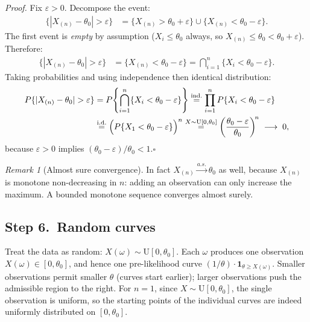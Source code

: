 \documentclass[a4paper,oneside,12pt]{extarticle}
\theoremstyle{plain}
\theoremstyle{definition}
\theoremstyle{remark}
\newtheorem{remark}[proposition]{Remark}
\begin{document}
\smallskip
\noindent\emph{Proof.} Fix $\varepsilon > 0$.  Decompose the event:
\begin{align*}
  \{|X_{(n)} - \theta_0| > \varepsilon\}
  &= \{X_{(n)} > \theta_0 + \varepsilon\} \cup \{X_{(n)} < \theta_0 - \varepsilon\}.
\end{align*}
The first event is \emph{empty} by assumption ($X_i \le \theta_0$
always, so $X_{(n)} \le \theta_0 < \theta_0 + \varepsilon$).
Therefore:
\begin{align*}
  \{|X_{(n)} - \theta_0| > \varepsilon\}
  &= \{X_{(n)} < \theta_0 - \varepsilon\}
   = \bigcap_{i=1}^n \{X_i < \theta_0 - \varepsilon\}.
\end{align*}
Taking probabilities and using independence then identical distribution:
\begin{align*}
  P\{|X_{(n)} - \theta_0| > \varepsilon\}
  &= P\!\left\{\bigcap_{i=1}^n \{X_i < \theta_0-\varepsilon\}\right\}
   \stackrel{\mathrm{ind.}}{=}
   \prod_{i=1}^n P\{X_i < \theta_0 - \varepsilon\} \\
  &\stackrel{\mathrm{i.d.}}{=}
   \Bigl(P\{X_1 < \theta_0-\varepsilon\}\Bigr)^n
   \stackrel{X\sim\mathrm{U}[0,\theta_0]}{=}
   \left(\frac{\theta_0-\varepsilon}{\theta_0}\right)^{\!n}
   \;\longrightarrow\; 0,
\end{align*}
because $\varepsilon > 0$ implies $(\theta_0-\varepsilon)/\theta_0 < 1$.\hfill$\square$

\begin{remark}[Almost sure convergence]
In fact $X_{(n)} \xrightarrow{a.s.} \theta_0$ as well, because
$X_{(n)}$ is monotone non-decreasing in $n$: adding an observation
can only increase the maximum.  A bounded monotone sequence converges
almost surely.
\end{remark}

\subsection{Step 6.\ Random curves}

Treat the data as random: $X(\omega)\sim\mathrm{U}[0,\theta_0]$.
Each $\omega$ produces one observation $X(\omega)\in[0,\theta_0]$,
and hence one pre-likelihood curve $(1/\theta)\cdot\mathbf{1}_{\theta
\ge X(\omega)}$.  Smaller observations permit smaller $\theta$
(curves start earlier); larger observations push the admissible
region to the right.  For $n=1$, since $X\sim\mathrm{U}[0,\theta_0]$,
the single observation is uniform, so the starting points of the
individual curves are indeed uniformly distributed on $[0,\theta_0]$.
\end{document}
